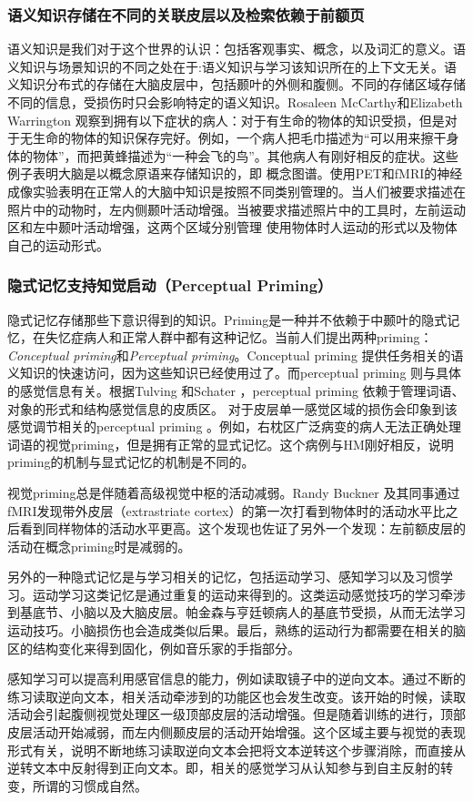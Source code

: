 \documentclass[UTF8,nofonts]{ctexart}
\begin{document}
\subsubsection{语义知识存储在不同的关联皮层以及检索依赖于前额页}
语义知识是我们对于这个世界的认识：包括客观事实、概念，以及词汇的意义。语义知识与场景知识的不同之处在于:语义知识与学习该知识所在的上下文无关。语义知识分布式的存储在大脑皮层中，包括颞叶的外侧和腹侧。不同的存储区域存储不同的信息，受损伤时只会影响特定的语义知识。Rosaleen McCarthy和Elizabeth Warrington 观察到拥有以下症状的病人：对于有生命的物体的知识受损，但是对于无生命的物体的知识保存完好。例如，一个病人把毛巾描述为“可以用来擦干身体的物体”，而把黄蜂描述为“一种会飞的鸟”。其他病人有刚好相反的症状。这些例子表明大脑是以概念原语来存储知识的，即 概念图谱。使用PET和fMRI的神经成像实验表明在正常人的大脑中知识是按照不同类别管理的。当人们被要求描述在照片中的动物时，左内侧颞叶活动增强。当被要求描述照片中的工具时，左前运动区和左中颞叶活动增强，这两个区域分别管理
使用物体时人运动的形式以及物体自己的运动形式。
\subsubsection{隐式记忆支持知觉启动（Perceptual Priming）}
隐式记忆存储那些下意识得到的知识。Priming是一种并不依赖于中颞叶的隐式记忆，在失忆症病人和正常人群中都有这种记忆。当前人们提出两种priming：\textit{Conceptual priming}和\textit{Perceptual priming}。Conceptual priming 提供任务相关的语义知识的快速访问，因为这些知识已经使用过了。而perceptual priming 则与具体的感觉信息有关。根据Tulving 和Schater ，perceptual priming 依赖于管理词语、对象的形式和结构感觉信息的皮质区。
对于皮层单一感觉区域的损伤会印象到该感觉调节相关的perceptual priming 。例如，右枕区广泛病变的病人无法正确处理词语的视觉priming，但是拥有正常的显式记忆。这个病例与HM刚好相反，说明priming的机制与显式记忆的机制是不同的。
\par
视觉priming总是伴随着高级视觉中枢的活动减弱。Randy Buckner 及其同事通过fMRI发现带外皮层（extrastriate cortex）的第一次打看到物体时的活动水平比之后看到同样物体的活动水平更高。这个发现也佐证了另外一个发现：左前额皮层的活动在概念priming时是减弱的。
\par
另外的一种隐式记忆是与学习相关的记忆，包括运动学习、感知学习以及习惯学习。运动学习这类记忆是通过重复的运动来得到的。这类运动感觉技巧的学习牵涉到基底节、小脑以及大脑皮层。帕金森与亨廷顿病人的基底节受损，从而无法学习运动技巧。小脑损伤也会造成类似后果。最后，熟练的运动行为都需要在相关的脑区的结构变化来得到固化，例如音乐家的手指部分。
\par
感知学习可以提高利用感官信息的能力，例如读取镜子中的逆向文本。通过不断的练习读取逆向文本，相关活动牵涉到的功能区也会发生改变。该开始的时候，读取活动会引起腹侧视觉处理区一级顶部皮层的活动增强。但是随着训练的进行，顶部皮层活动开始减弱，而左内侧颞皮层的活动开始增强。这个区域主要与视觉的表现形式有关，说明不断地练习读取逆向文本会把将文本逆转这个步骤消除，而直接从逆转文本中反射得到正向文本。即，相关的感觉学习从认知参与到自主反射的转变，所谓的习惯成自然。
\end{document}
